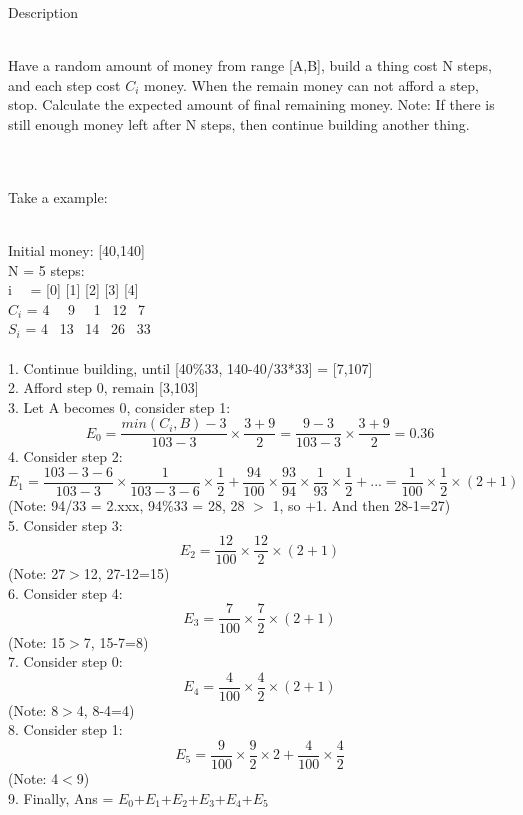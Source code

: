 \documentclass[a4paper,12pt]{article}
\begin{document}
\begin{bfseries}
Description
\end{bfseries}
\\
Have a random amount of money from range [A,B], build a thing cost N steps, and each step cost $C_i$ money. When the remain money can not afford a step, stop. Calculate the expected amount of final remaining money. Note: If there is still enough money left after N steps, then continue building another thing.
\\
\\
\\
\begin{bfseries}
Take a example:
\end{bfseries}
\\
Initial money: [40,140]\\
N = 5 steps:\\
i \ \ = [0] [1] [2] [3] [4]\\
$C_i$ =  4 \ \ 9 \ \ 1 \ 12 \ 7\\
$S_i$ =  4 \ 13 \ 14 \ 26 \ 33\\
\\
1. Continue building, until [40\%33, 140-40/33*33] = [7,107]\\
2. Afford step 0, remain [3,103]\\
3. Let A becomes 0, consider step 1:
\[
E_0 = \frac{min(C_i,B)-3}{103-3} \times \frac{3+9}{2} = \frac{9-3}{103-3} \times \frac{3+9}{2} = 0.36
\]
4. Consider step 2:
\[
E_1 = \frac{103-3-6}{103-3} \times \frac{1}{103-3-6} \times \frac{1}{2} + \frac{94}{100} \times \frac{93}{94} \times \frac{1}{93} \times \frac{1}{2} + ... = \frac{1}{100} \times \frac{1}{2} \times (2+1)
\]
(Note: 94/33 = 2.xxx, 94\%33 = 28, 28 $>$ 1, so +1. And then 28-1=27)\\
5. Consider step 3:
\[
E_2 = \frac{12}{100} \times \frac{12}{2} \times (2+1)
\]
(Note: 27$>$12, 27-12=15)\\
6. Consider step 4:
\[
E_3 = \frac{7}{100} \times \frac{7}{2} \times (2+1)
\]
(Note: 15$>$7, 15-7=8)\\
7. Consider step 0:
\[
E_4 = \frac{4}{100} \times \frac{4}{2} \times (2+1)
\]
(Note: 8$>$4, 8-4=4)\\
8. Consider step 1:
\[
E_5 = \frac{9}{100} \times \frac{9}{2} \times 2 + \frac{4}{100} \times \frac{4}{2}
\]
(Note: 4$<$9)\\
9. Finally, Ans = $E_0$+$E_1$+$E_2$+$E_3$+$E_4$+$E_5$
\end{document}
